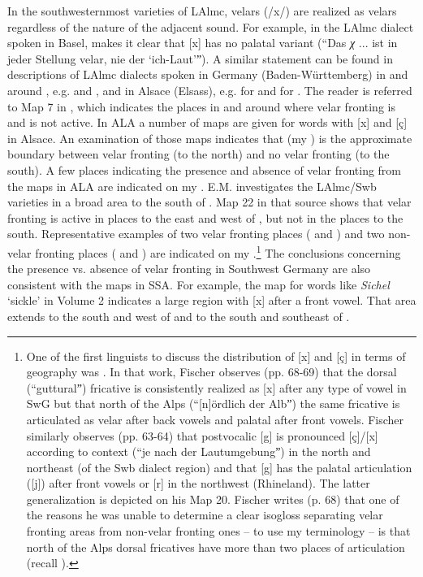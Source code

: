 In the southwesternmost varieties of LAlmc, velars (/x/) are realized as velars regardless of the nature of the adjacent sound. For example, in the LAlmc dialect spoken in Basel, \citet[69]{Heusler1888} makes it clear that [x] has no palatal variant (“Das \textit{χ} ... ist in jeder Stellung velar, nie der ‘ich-Laut’ˮ). A similar statement can be found in descriptions of LAlmc dialects spoken in Germany (Baden-Württemberg) in and around , e.g. \citet[43]{Ehret1911} and \citet[50]{Eckerle1936}, and in Alsace (Elsass), e.g. \citet[8]{Mankel1886} for  and \citet[61]{Henry1900} for . The reader is referred to Map 7 in \citet{Klausmann1985a,Klausmann1985b}, which indicates the places in and around  where velar fronting is and is not active. In ALA a number of maps are given for words with [x] and [ç] in Alsace. An examination of those maps indicates that  (my ) is the approximate boundary between velar fronting (to the north) and no velar fronting (to the south). A few places indicating the presence and absence of velar fronting from the maps in ALA are indicated on my . E.M. \citet{Hall1991, Hall1991b} investigates the LAlmc/Swb varieties in  a broad area to the south of . Map 22 in that source shows that velar fronting is active in places to the east and west of , but not in the places to the south. Representative examples of two velar fronting places ( and ) and two non-velar fronting places ( and ) are indicated on my .\footnote{{One of the first linguists to discuss the distribution of [x] and [ç] in terms of geography was \citet{Fischer1895}. In that work, Fischer observes (pp. 68-69) that the dorsal (“gutturalˮ) fricative is consistently realized as [x] after any type of vowel in SwG but that north of the Alps (“[n]ördlich der Albˮ) the same fricative is articulated as velar after back vowels and palatal after front vowels. Fischer similarly observes (pp. 63-64) that postvocalic [g] is pronounced [ç]/[x] according to context (“je nach der Lautumgebungˮ) in the north and northeast (of the Swb dialect region) and that [g] has the palatal articulation ([j]) after front vowels or [r] in the northwest (Rhineland). The latter generalization is depicted on his Map 20. Fischer writes (p. 68) that one of the reasons he was unable to determine a clear isogloss separating velar fronting areas from non-velar fronting ones -- to use my terminology -- is that north of the Alps dorsal fricatives have more than two places of articulation (recall ).} } The conclusions concerning the presence vs. absence of velar fronting in Southwest Germany are also consistent with the maps in SSA. For example, the map for words like \textit{Sichel}  ‘sickle’ in Volume 2 indicates a large region with [x] after a front vowel. That area extends to the south and west of  and to the south and southeast of .

